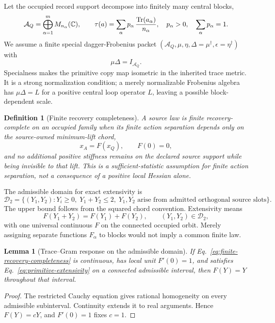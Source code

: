 \documentclass[11pt]{article}
\newtheorem{definition}{Definition}
\newtheorem{lemma}{Lemma}
\newcommand{\Tr}{\operatorname{Tr}}
\begin{document}
Let the occupied record support decompose into finitely many central blocks,
\begin{equation}
 \mathcal A_Q=\bigoplus_{\alpha=1}^m M_{n_\alpha}(\mathbb C),
 \qquad
 \tau(a)=\sum_\alpha p_\alpha\,{\Tr(a_\alpha)\over n_\alpha},
 \quad p_\alpha>0,
 \quad \sum_\alpha p_\alpha=1.
 \label{eq:finite-record-algebra}
\end{equation}
We assume a finite special dagger-Frobenius packet
\((\mathcal A_Q,\mu,\eta,\Delta=\mu^\dagger,\epsilon=\eta^\dagger)\) with
\begin{equation}
 \mu\Delta=I_{\mathcal A_Q}.
 \label{eq:specialness}
\end{equation}
Specialness makes the primitive copy map isometric in the inherited trace
metric.  It is a strong normalization condition; a merely normalizable
Frobenius algebra has \(\mu\Delta=L\) for a positive central loop operator
\(L\), leaving a possible block-dependent scale.

\begin{definition}[Finite recovery completeness]
A source law is \emph{finite recovery-complete} on an occupied family when
its finite action separation depends only on the source-owned minimum-lift
chord,
\begin{equation}
 x_A=F(x_Q),\qquad F(0)=0,
 \label{eq:finite-recovery-completeness}
\end{equation}
and no additional positive stiffness remains on the declared source support
while being invisible to that lift.  This is a sufficient-statistic
assumption for finite action separation, not a consequence of a positive
local Hessian alone.
\end{definition}

The admissible domain for exact extensivity is
\begin{equation}
 \mathcal D_2=\{(Y_1,Y_2):Y_i\geq0,\;Y_1+Y_2\leq2,\;
 Y_1,Y_2\text{ arise from admitted orthogonal source slots}\}.
 \label{eq:additive-domain}
\end{equation}
The upper bound follows from the squared chord convention.  Extensivity means
\begin{equation}
 F(Y_1+Y_2)=F(Y_1)+F(Y_2),\qquad (Y_1,Y_2)\in\mathcal D_2,
 \label{eq:primitive-extensivity}
\end{equation}
with one universal continuous \(F\) on the connected occupied orbit.  Merely
assigning separate functions \(F_\alpha\) to blocks would not imply a common
finite law.

\begin{lemma}[Trace--Gram response on the admissible domain]
If Eq.~\eqref{eq:finite-recovery-completeness} is continuous, has local unit
\(F'(0)=1\), and satisfies Eq.~\eqref{eq:primitive-extensivity} on a connected
admissible interval, then \(F(Y)=Y\) throughout that interval.
\end{lemma}
\begin{proof}
The restricted Cauchy equation gives rational homogeneity on every admissible
subinterval.  Continuity extends it to real arguments.  Hence \(F(Y)=cY\),
and \(F'(0)=1\) fixes \(c=1\).
\end{proof}
\end{document}
